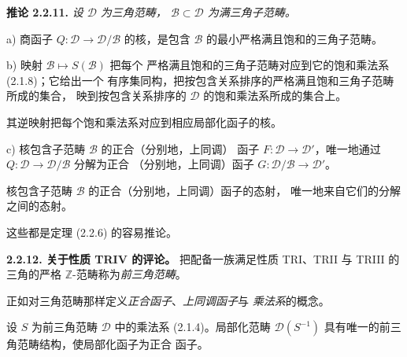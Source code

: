 \clearpage
{}%
\begingroup
\small
\setlength{\parskip}{0pt}%
\setlength{\emergencystretch}{1.5em}%

\noindent\textbf{推论 2.2.11.}\quad
\begingroup\itshape
{}%
设 $\mathcal D$ 为三角范畴，
$\mathcal B\subset\mathcal D$ 为满三角子范畴。

\par\noindent a) 商函子
$Q\colon\mathcal D\longrightarrow\mathcal D/\mathcal B$ 的核，是包含
$\mathcal B$ 的最小严格满且饱和的三角子范畴。

\par\noindent b) 映射 $\mathcal B\longmapsto S(\mathcal B)$ 把每个
严格满且饱和的三角子范畴对应到它的饱和乘法系 (2.1.8)；它给出一个
有序集同构，把按包含关系排序的严格满且饱和三角子范畴所成的集合，
映到按包含关系排序的 $\mathcal D$ 的饱和乘法系所成的集合上。

其逆映射把每个饱和乘法系对应到相应局部化函子的核。

\par\noindent c) 核包含子范畴 $\mathcal B$ 的正合（分别地，上同调）
函子 $F\colon\mathcal D\longrightarrow\mathcal D'$，唯一地通过
$Q\colon\mathcal D\longrightarrow\mathcal D/\mathcal B$ 分解为正合
（分别地，上同调）函子
$G\colon\mathcal D/\mathcal B\longrightarrow\mathcal D'$。

核包含子范畴 $\mathcal B$ 的正合（分别地，上同调）函子的态射，
唯一地来自它们的分解之间的态射。
\endgroup

这些都是定理 (2.2.6) 的容易推论。

\smallskip
\noindent\textbf{2.2.12. 关于性质 TRIV 的评论。}
%
把配备一族满足性质 TRI、TRII 与 TRIII 的三角的严格
$\mathbb Z$-范畴称为\emph{前三角范畴}。

正如对三角范畴那样定义\emph{正合函子}、\emph{上同调函子}与
\emph{乘法系}的概念。

设 $S$ 为前三角范畴 $\mathcal D$ 中的乘法系 (2.1.4)。局部化范畴
$\mathcal D(S^{-1})$ 具有唯一的前三角范畴结构，使局部化函子为正合
函子。

